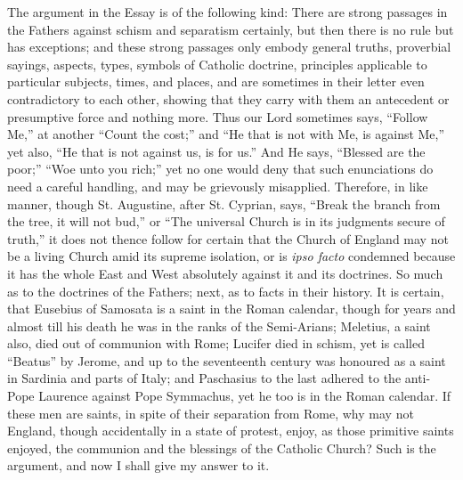 The argument in the Essay is of the following kind: There are
strong passages in the Fathers against schism and separatism
certainly, but then there is no rule but has exceptions; and these
strong passages only embody general truths, proverbial sayings,
aspects, types, symbols of Catholic doctrine, principles applicable to
particular subjects, times, and places, and are sometimes in
their letter even contradictory to each other, showing that they carry
with them an antecedent or presumptive force and nothing more. Thus
our Lord sometimes says, ``Follow Me,'' at another ``Count
the cost;'' and ``He that is not with Me, is against Me,''
yet also, ``He that is not against us, is for us.'' And He
says, ``Blessed are the poor;'' ``Woe unto you rich;''
yet no one would deny that such enunciations do need a careful
handling, and may be grievously misapplied. Therefore, in like manner,
though St. Augustine, after St. Cyprian, says, ``Break the branch
from the tree, it will not bud,'' or ``The universal Church is
in its judgments secure of truth,'' it does not thence follow for
certain that the Church of England may not be a living Church amid its
supreme isolation, or is \emph{ipso facto} condemned because it has
the whole East and West absolutely against it and its doctrines. So
much as to the doctrines of the Fathers; next, as to facts in their
history. It is certain, that Eusebius of Samosata is a saint in the
Roman calendar, though for years and almost till his death he was in
the ranks of the Semi-Arians; Meletius, a saint also, died out of
communion with Rome; Lucifer died in schism, yet is called ``Beatus''
by Jerome, and up to the seventeenth century was honoured as a saint
in Sardinia and parts of Italy; and Paschasius to the last adhered to
the anti-Pope Laurence against Pope Symmachus, yet he too is in the
Roman calendar. If these men are saints, in spite of their separation
from Rome, why may not England, though accidentally in a state of
protest, enjoy, as those primitive saints enjoyed, the communion and
the blessings of the Catholic Church? Such is the argument, and now I
shall give my answer to it.

